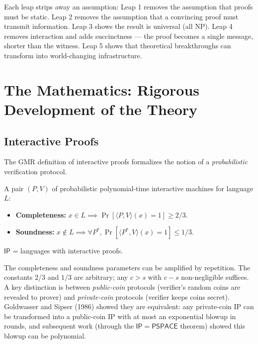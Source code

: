 Each leap strips away an assumption: Leap 1 removes the assumption that proofs must be static. Leap 2 removes the assumption that a convincing proof must transmit information. Leap 3 shows the result is universal (all NP). Leap 4 removes interaction and adds succinctness --- the proof becomes a single message, shorter than the witness. Leap 5 shows that theoretical breakthroughs can transform into world-changing infrastructure.

\section{The Mathematics: Rigorous Development of the Theory}
\label{sec:zk:math}

\subsection{Interactive Proofs}
\label{sec:zk:ip}

The GMR definition of interactive proofs formalizes the notion of a \emph{probabilistic} verification protocol.

\begin{definition}
A pair $(P, V)$ of probabilistic polynomial-time interactive machines for language $L$:
\begin{itemize}
\item \textbf{Completeness:} $x \in L \implies \Pr[\langle P, V \rangle(x) = 1] \ge 2/3$.
\item \textbf{Soundness:} $x \notin L \implies \forall P^*, \Pr[\langle P^*, V \rangle(x) = 1] \le 1/3$.
\end{itemize}
$\mathsf{IP}$ = languages with interactive proofs.
\end{definition}

The completeness and soundness parameters can be amplified by repetition. The constants $2/3$ and $1/3$ are arbitrary; any $c > s$ with $c - s$ non-negligible suffices. A key distinction is between \emph{public-coin} protocols (verifier's random coins are revealed to prover) and \emph{private-coin} protocols (verifier keeps coins secret). Goldwasser and Sipser (1986) showed they are equivalent: any private-coin IP can be transformed into a public-coin IP with at most an exponential blowup in rounds, and subsequent work (through the $\mathsf{IP} = \mathsf{PSPACE}$ theorem) showed this blowup can be polynomial.

